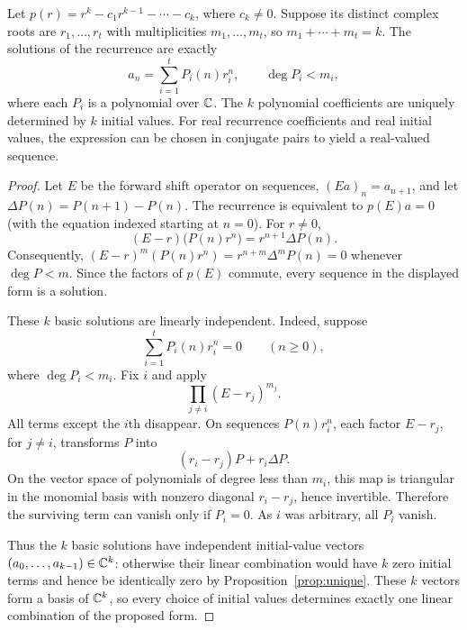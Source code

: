\documentclass[11pt, oneside]{article}
\begin{document}
\begin{theorem}\label{thm:generalrec}
Let $p(r)=r^k-c_1r^{k-1}-\cdots-c_k$, where $c_k\ne0$. Suppose its distinct complex roots are $r_1, \ldots, r_t$ with multiplicities $m_1, \ldots, m_t$, so $m_1+\cdots+m_t=k$. The solutions of the recurrence are exactly
\[
a_n=\sum_{i=1}^t P_i(n)r_i^n,
\qquad\deg P_i<m_i,
\]
where each $P_i$ is a polynomial over $\mathbb{C}$. The $k$ polynomial coefficients are uniquely determined by $k$ initial values. For real recurrence coefficients and real initial values, the expression can be chosen in conjugate pairs to yield a real-valued sequence.
\end{theorem}
\begin{proof}
Let $E$ be the forward shift operator on sequences, $(Ea)_n=a_{n+1}$, and let $\Delta P(n)=P(n+1)-P(n)$. The recurrence is equivalent to $p(E)a=0$ (with the equation indexed starting at $n=0$). For $r\ne0$,
\[
(E-r)\bigl(P(n)r^n\bigr)=r^{n+1}\Delta P(n).
\]
Consequently, $(E-r)^m(P(n)r^n)=r^{n+m}\Delta^mP(n)=0$ whenever $\deg P<m$. Since the factors of $p(E)$ commute, every sequence in the displayed form is a solution.

These $k$ basic solutions are linearly independent. Indeed, suppose
\[
\sum_{i=1}^tP_i(n)r_i^n=0\qquad(n\ge0),
\]
where $\deg P_i<m_i$. Fix $i$ and apply
\[
\prod_{j\ne i}(E-r_j)^{m_j}.
\]
All terms except the $i$th disappear. On sequences $P(n)r_i^n$, each factor $E-r_j$, for $j\ne i$, transforms $P$ into
\[
(r_i-r_j)P+r_i\Delta P.
\]
On the vector space of polynomials of degree less than $m_i$, this map is triangular in the monomial basis with nonzero diagonal $r_i-r_j$, hence invertible. Therefore the surviving term can vanish only if $P_i=0$. As $i$ was arbitrary, all $P_i$ vanish.

Thus the $k$ basic solutions have independent initial-value vectors $(a_0, \ldots, a_{k-1})\in\mathbb{C}^k$: otherwise their linear combination would have $k$ zero initial terms and hence be identically zero by Proposition~\ref{prop:unique}. These $k$ vectors form a basis of $\mathbb{C}^k$, so every choice of initial values determines exactly one linear combination of the proposed form.
\end{proof}
\end{document}
